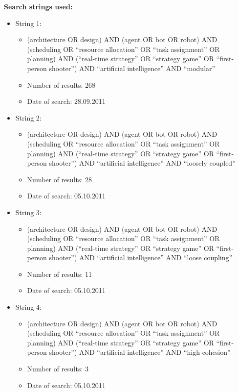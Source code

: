 \textbf{Search strings used:}
\begin{itemize}
\item String 1:
\begin{itemize}
\item (architecture OR design) AND (agent OR bot OR robot) AND (scheduling OR ``resource allocation'' OR ``task assignment'' OR planning) AND (``real-time strategy'' OR ``strategy game'' OR ``first-person shooter'') AND ``artificial intelligence'' AND ``modular''
\item Number of results: 268
\item Date of search: 28.09.2011
\end{itemize}
\item String 2:
\begin{itemize}
\item (architecture OR design) AND (agent OR bot OR robot) AND (scheduling OR ``resource allocation'' OR ``task assignment'' OR planning) AND (``real-time strategy'' OR ``strategy game'' OR ``first-person shooter'') AND ``artificial intelligence'' AND ``loosely coupled''
\item Number of results: 28
\item Date of search: 05.10.2011
\end{itemize}
\item String 3:
\begin{itemize}
\item (architecture OR design) AND (agent OR bot OR robot) AND (scheduling OR ``resource allocation'' OR ``task assignment'' OR planning) AND (``real-time strategy'' OR ``strategy game'' OR ``first-person shooter'') AND ``artificial intelligence'' AND ``loose coupling''
\item Number of results: 11
\item Date of search: 05.10.2011
\end{itemize}
\item String 4:
\begin{itemize}
\item (architecture OR design) AND (agent OR bot OR robot) AND (scheduling OR ``resource allocation'' OR ``task assignment''  OR planning) AND (``real-time strategy'' OR ``strategy game'' OR ``first-person shooter'') AND ``artificial intelligence'' AND ``high cohesion''
\item Number of results: 3
\item Date of search: 05.10.2011
\end{itemize}
\end{itemize}
